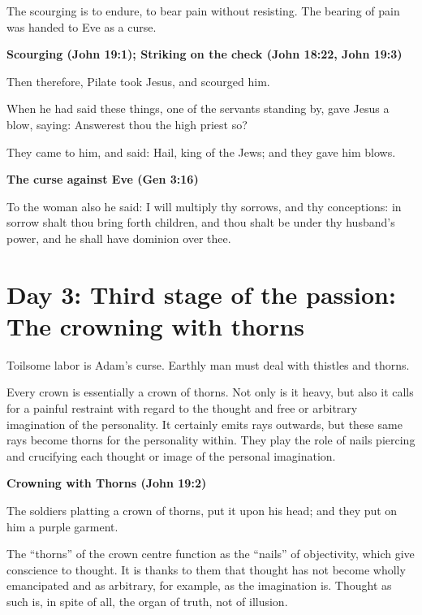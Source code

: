 The scourging is to endure, to bear pain without resisting. The bearing of pain was handed to Eve as a curse.

\textbf{Scourging (John 19:1); Striking on the check (John 18:22, John 19:3)}

Then therefore, Pilate took Jesus, and scourged him.

When he had said these things, one of the servants standing by, gave Jesus a blow, saying: Answerest thou the high priest so?

They came to him, and said: Hail, king of the Jews; and they gave him blows.

\textbf{The curse against Eve (Gen 3:16)}

To the woman also he said: I will multiply thy sorrows, and thy conceptions: in sorrow shalt thou bring forth children, and thou shalt be under thy husband's power, and he shall have dominion over thee.

\section{Day 3: Third stage of the passion: The crowning with thorns}
Toilsome labor is Adam's curse. Earthly man must deal with thistles and thorns.

\begin{quotex}
Every crown is essentially a crown of thorns. Not only is it heavy, but also it calls for a painful restraint with regard to the thought and free or arbitrary imagination of the personality. It certainly emits rays outwards, but these same rays become thorns for the personality within. They play the role of nails piercing and crucifying each thought or image of the personal imagination.

\end{quotex}

\textbf{Crowning with Thorns (John 19:2)}

The soldiers platting a crown of thorns, put it upon his head; and they put on him a purple garment.

\begin{quotex}
The ``thorns'' of the crown centre function as the ``nails'' of objectivity, which give conscience to thought. It is thanks to them that thought has not become wholly emancipated and as arbitrary, for example, as the imagination is. Thought as such is, in spite of all, the organ of truth, not of illusion. 

\end{quotex}


